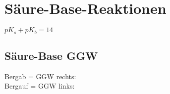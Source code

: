 \section{Säure-Base-Reaktionen}
    $pK_{s}+ pK_{b} = 14$
\subsection{Säure-Base GGW}
    Bergab = GGW rechts: \\
    Bergauf = GGW links: \\
